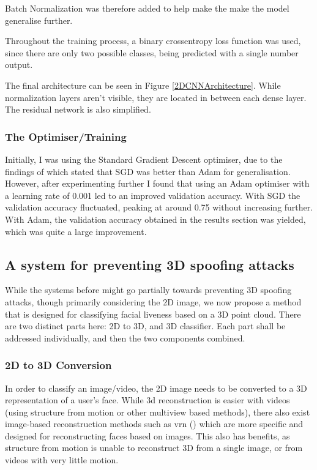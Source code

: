 \documentclass[10pt,a4paper]{article}
\begin{document}
            Batch Normalization was therefore added to help make the make the model generalise further.

            Throughout the training process, a binary crossentropy loss function was used, since there are only two possible classes, being predicted with a single number output. 

            The final architecture can be seen in Figure \ref{2DCNNArchitecture}. While normalization layers aren't visible, they are located in between each dense layer. The residual network
            is also simplified.

        \subsubsection{The Optimiser/Training}
            Initially, I was using the Standard Gradient Descent optimiser, due to the findings of \cite{SGDBetterThanAdamForImageClassification} which stated
            that SGD was better than Adam for generalisation. However, after experimenting further I found that using an Adam optimiser with a learning rate of 0.001
            led to an improved validation accuracy. With SGD the validation accuracy fluctuated, peaking at around 0.75 without increasing further. With Adam, the
            validation accuracy obtained in the results section was yielded, which was quite a large improvement.

    \subsection{A system for preventing 3D spoofing attacks}
        While the systems before might go partially towards preventing 3D spoofing attacks, though primarily considering the 2D image, we now propose a method
        that is designed for classifying facial liveness based on a 3D point cloud. There are two distinct parts here: 2D to 3D, and 3D classifier. Each part shall be addressed
        individually, and then the two components combined.

        \subsubsection{2D to 3D Conversion}
            In order to classify an image/video, the 2D image needs to be converted to a 3D representation of a user's face. While 3d reconstruction is easier with videos (using structure from motion or other multiview based methods),
            there also exist image-based reconstruction methods such as vrn (\citealt{3DReconstructionMethod}) which are more specific and designed for reconstructing faces based on images. This also has benefits, as structure from motion
            is unable to reconstruct 3D from a single image, or from videos with very little motion.
\end{document}
